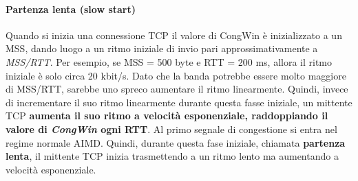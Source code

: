 \documentclass[11pt,a4paper]{article}
\begin{document}
\paragraph{Partenza lenta (slow start)}
Quando si inizia una connessione TCP il valore di CongWin è inizializzato a un MSS, dando luogo a un ritmo iniziale di invio pari approssimativamente a \emph{MSS/RTT}. Per esempio, se MSS = 500 byte e RTT = 200 ms, allora il ritmo iniziale è solo circa 20 kbit/s. Dato che la banda potrebbe essere molto maggiore di MSS/RTT, sarebbe uno spreco aumentare il ritmo linearmente. Quindi, invece di incrementare il suo ritmo linearmente durante questa fasse iniziale, un mittente TCP \textbf{aumenta il suo ritmo a velocità esponenziale, raddoppiando il valore di \emph{CongWin} ogni RTT}. Al primo segnale di congestione si entra nel regime normale AIMD. Quindi, durante questa fase iniziale, chiamata \textbf{partenza lenta}, il mittente TCP inizia trasmettendo a un ritmo lento ma aumentando a velocità esponenziale.
\end{document}

